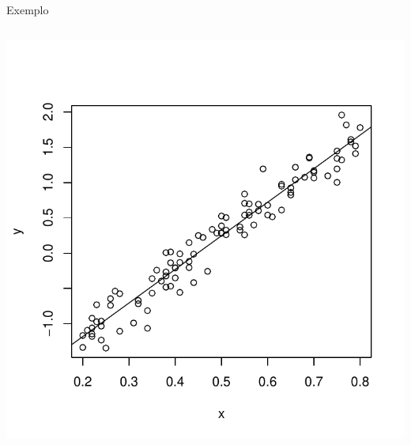 \documentclass{beamer}\usepackage[]{graphicx}\usepackage[]{color}
\newenvironment{knitrout}{}{} %
\renewenvironment{knitrout}{\setlength{\topsep}{0mm}}{}
\begin{document}
\begin{frame}{Exemplo}
\begin{columns}[c]
\begin{knitrout}
\color{fgcolor}
\includegraphics[width=1\linewidth]{figure/scatteriaf-1} 

\end{knitrout}

\end{columns}
\end{frame}
\end{document}
